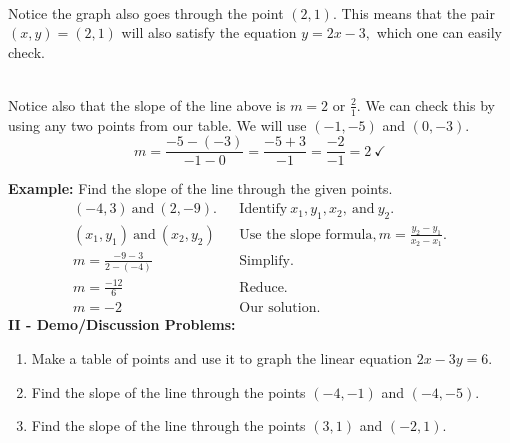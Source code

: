 \documentclass[12pt]{article}
\theoremstyle{definition}
\begin{document}
\ \par
Notice the graph also goes through the point $(2, 1)$.  This means that the pair $(x,y)=(2,1)$ will also satisfy the equation $y=2x-3,$ which one can easily check.\\
\ \par
Notice also that the slope of the line above is $m=2$ or $\frac{2}{1}$.  We can check this by using any two points from our table.  We will use $(-1,-5)$ and $(0,-3)$.
\[ m=\frac{-5-(-3)}{-1-0}=\frac{-5+3}{-1}=\frac{-2}{-1}=2 \ \checkmark\]
	
{\bf Example:} Find the slope of the line through the given points. 
  \begin{eqnarray*} (- 4, 3) \ \text{and} \ (2,- 9). &  & \text{Identify} \ x_1, y_1, x_2,\ \text{and} \ y_2.\\
    (x_1, y_1) \ \text{and} \ (x_2, y_2) &  & \text{Use the slope formula}, m = \frac{y_2 - y_1}{x_2 - x_1}.\\
    m = \frac{- 9 - 3}{2 - (- 4)} &  & \text{Simplify.}\\
    m = \frac{-12}{6} &  & \text{Reduce.}\\
    m = - 2 &  & \text{Our solution.}
  \end{eqnarray*}
\newpage
{\bf II - Demo/Discussion Problems:}
\begin{enumerate}
\item Make a table of points and use it to graph the linear equation $2x-3y=6$.
\item Find the slope of the line through the points $(-4,-1)$ and $(-4,-5)$.
\item Find the slope of the line through the points $(3,1)$ and $(-2,1)$.
\end{enumerate}
\end{document}
